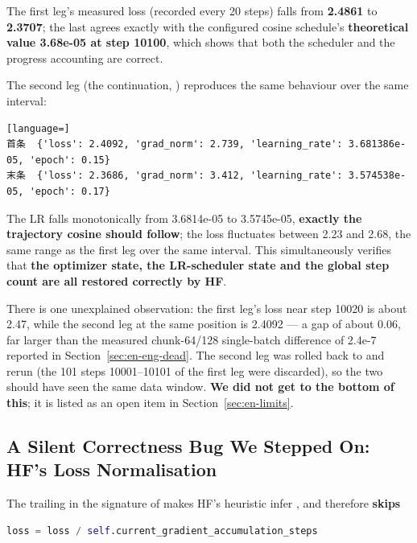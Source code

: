 The first leg's measured loss (recorded every 20 steps) falls from \textbf{2.4861} to
\textbf{2.3707}; the last  agrees exactly with the
configured cosine schedule's \textbf{theoretical value 3.68e-05 at step 10100}, which shows
that both the scheduler and the progress accounting are correct.

The second leg (the continuation, ) reproduces the same behaviour over
the same interval:

\begin{lstlisting}[language=]
首条  {'loss': 2.4092, 'grad_norm': 2.739, 'learning_rate': 3.681386e-05, 'epoch': 0.15}
末条  {'loss': 2.3686, 'grad_norm': 3.412, 'learning_rate': 3.574538e-05, 'epoch': 0.17}
\end{lstlisting}

The LR falls monotonically from 3.6814e-05 to 3.5745e-05, \textbf{exactly the trajectory
cosine should follow}; the loss fluctuates between 2.23 and 2.68, the same range as the
first leg over the same interval. This simultaneously verifies that \textbf{the optimizer
state, the LR-scheduler state and the global step count are all restored correctly by HF}.

\begin{notebox}
There is one unexplained observation: the first leg's loss near step 10020 is about 2.47,
while the second leg at the same position is 2.4092 --- a gap of about 0.06, far larger than
the measured chunk-64/128 single-batch difference of 2.4e-7 reported in
Section~\ref{sec:en-eng-dead}. The second leg was rolled back to  and
rerun (the 101 steps 10001--10101 of the first leg were discarded), so the two should have
seen the same data window. \textbf{We did not get to the bottom of this}; it is listed as an
open item in Section~\ref{sec:en-limits}.
\end{notebox}

\subsection{A Silent Correctness Bug We Stepped On: HF's Loss Normalisation}
\label{sec:en-pipe-lossbug}

The trailing  in the signature of  makes
HF's heuristic infer , and
 therefore \textbf{skips}

\begin{lstlisting}[language=Python]
loss = loss / self.current_gradient_accumulation_steps
\end{lstlisting}

